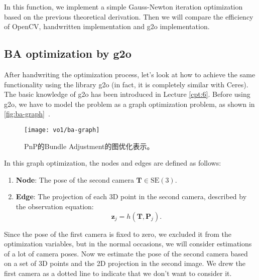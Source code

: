In this function, we implement a simple Gauss-Newton iteration optimization based on the previous theoretical derivation. Then we will compare the efficiency of OpenCV, handwritten implementation and g2o implementation.

\subsection{BA optimization by g2o}
After handwriting the optimization process, let's look at how to achieve the same functionality using the library g2o (in fact, it is completely similar with Ceres). The basic knowledge of g2o has been introduced in Lecture \ref{cpt:6}. Before using g2o, we have to model the problem as a graph optimization problem, as shown in \autoref{fig:ba-graph}~.

\begin{figure}[!htp]
	\centering
	\texttt{[image: vo1/ba-graph]}
	\caption{PnP的Bundle Adjustment的图优化表示。}
	\label{fig:ba-graph}
\end{figure}

In this graph optimization, the nodes and edges are defined as follows:
\begin{enumerate}
	\item \textbf{Node}: The pose of the second camera $\bm{T} \in \mathrm{SE}(3)$.
	\item \textbf{Edge}: The projection of each 3D point in the second camera, described by the observation equation:
	\[
	\bm{z}_j = h(\bm{T}, \bm{P}_{j}).
	\]
\end{enumerate}

Since the pose of the first camera is fixed to zero, we excluded it from the optimization variables, but in the normal occasions, we will consider estimations of a lot of camera poses. Now we estimate the pose of the second camera based on a set of 3D points and the 2D projection in the second image. We drew the first camera as a dotted line to indicate that we don't want to consider it.

